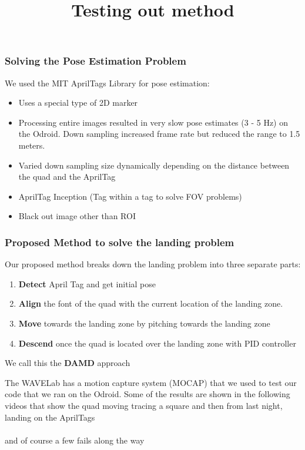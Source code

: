 \documentclass{beamer}
\begin{document}
\begin{frame}
	\frametitle{Solving the Pose Estimation Problem}
	We used the MIT AprilTags Library for pose estimation:
	\begin{itemize}
	\item Uses a special type of 2D marker
	\item Processing entire images resulted in very slow pose estimates (3 - 5 Hz) on the Odroid. Down sampling increased frame rate but reduced the range to 1.5 meters.	
	\item  Varied down sampling size dynamically depending on the distance between the quad and the AprilTag
	\item AprilTag Inception (Tag within a tag to solve FOV problems)
	\item Black out image other than ROI
\end{itemize}

\end{frame}


\begin{frame}
	\frametitle{Proposed Method to solve the landing problem}
	 Our proposed method breaks down the landing problem into three separate parts:
	\begin{enumerate}
	\item \textbf{Detect} April Tag and get initial pose
	\item \textbf{Align} the font of the quad with the current location of the landing zone.
	\item \textbf{Move} towards the landing zone by pitching towards the landing zone
	\item \textbf{Descend} once the quad is located over the landing zone with PID controller
	\end{enumerate}
	
	We call this the \textbf{DAMD} approach
	
\end{frame}
\begin{frame}
\title{Testing out method}
The WAVELab has a motion capture system (MOCAP) that we used to test our code that we ran on the Odroid. Some of the results are shown in the following videos that show the quad moving tracing a square and then from last night, landing on the AprilTags \\

\href{https://www.youtube.com/watch?v=9oUxANr1j0o}{} \\
and of course a few fails along the way \\
\href{https://youtu.be/2i0S6vrP9oc?t=53}{}

\end{frame}	
\end{document}
